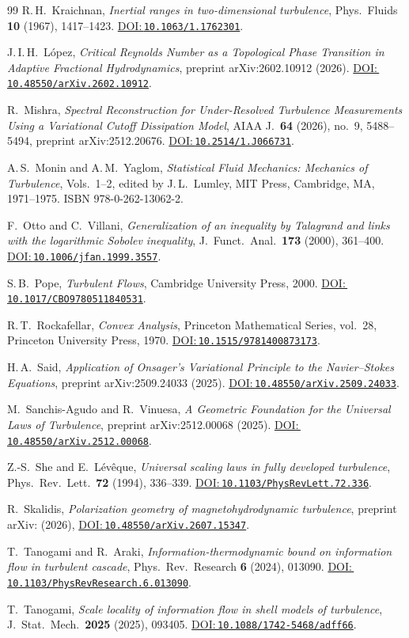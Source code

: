 \documentclass[12pt,a4paper]{article}
\newcommand{\doilink}[1]{\href{https://doi.org/#1}{DOI:\,\nolinkurl{#1}}}
\theoremstyle{definition}
\theoremstyle{plain}
\theoremstyle{remark}
\begin{document}
\begin{thebibliography}{99}
R.\,H.~Kraichnan,
\emph{Inertial ranges in two-dimensional turbulence},
Phys.\ Fluids \textbf{10} (1967), 1417--1423.
\doilink{10.1063/1.1762301}.

J.\,I.\,H.~López,
\emph{Critical Reynolds Number as a Topological Phase Transition in Adaptive Fractional Hydrodynamics},
preprint arXiv:2602.10912 (2026).
\doilink{10.48550/arXiv.2602.10912}.

R.~Mishra,
\emph{Spectral Reconstruction for Under-Resolved Turbulence Measurements Using a Variational Cutoff Dissipation Model},
AIAA J.\ \textbf{64} (2026), no.~9, 5488--5494,
preprint arXiv:2512.20676.
\doilink{10.2514/1.J066731}.

A.\,S.~Monin and A.\,M.~Yaglom,
\emph{Statistical Fluid Mechanics: Mechanics of Turbulence}, Vols.~1--2,
edited by J.\,L.~Lumley, MIT Press, Cambridge, MA, 1971--1975.
ISBN 978-0-262-13062-2.

F.~Otto and C.~Villani,
\emph{Generalization of an inequality by Talagrand and links with the logarithmic Sobolev inequality},
J.\ Funct.\ Anal.~\textbf{173} (2000), 361--400.
\doilink{10.1006/jfan.1999.3557}.

S.\,B.~Pope,
\emph{Turbulent Flows},
Cambridge University Press, 2000.
\doilink{10.1017/CBO9780511840531}.

R.\,T.~Rockafellar,
\emph{Convex Analysis},
Princeton Mathematical Series, vol.~28,
Princeton University Press, 1970.
\doilink{10.1515/9781400873173}.

H.\,A.~Said,
\emph{Application of Onsager's Variational Principle to the Navier--Stokes Equations},
preprint arXiv:2509.24033 (2025).
\doilink{10.48550/arXiv.2509.24033}.

M.~Sanchis-Agudo and R.~Vinuesa,
\emph{A Geometric Foundation for the Universal Laws of Turbulence},
preprint arXiv:2512.00068 (2025).
\doilink{10.48550/arXiv.2512.00068}.

Z.-S.~She and E.~Lévêque,
\emph{Universal scaling laws in fully developed turbulence},
Phys.\ Rev.\ Lett.\ \textbf{72} (1994), 336--339.
\doilink{10.1103/PhysRevLett.72.336}.

R.~Skalidis,
\emph{Polarization geometry of mag\-ne\-to\-hy\-dro\-dy\-nam\-ic turbulence},
preprint arXiv: (2026),
\doilink{10.48550/arXiv.2607.15347}.

T.~Tanogami and R.~Araki,
\emph{Information-thermodynamic bound on information flow in turbulent cascade},
Phys.\ Rev.\ Research \textbf{6} (2024), 013090.
\doilink{10.1103/PhysRevResearch.6.013090}.

T.~Tanogami,
\emph{Scale locality of information flow in shell models of turbulence},
J.\ Stat.\ Mech.\ \textbf{2025} (2025), 093405.
\doilink{10.1088/1742-5468/adff66}.

\end{thebibliography}
\endgroup
\end{document}
